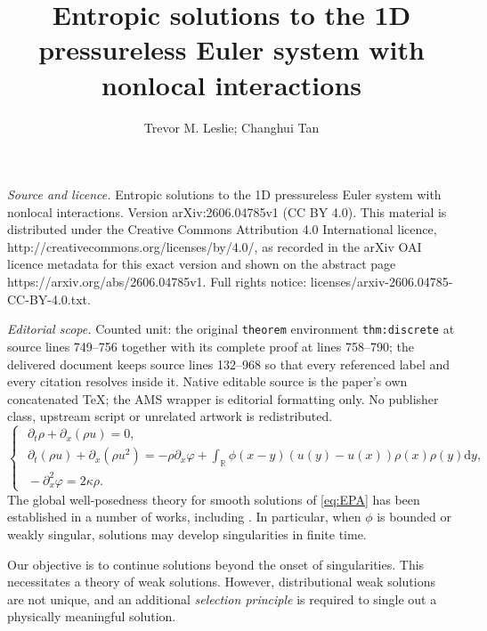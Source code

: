 \documentclass[10pt,a4paper]{amsart}
\def\R{\mathbb{R}}
\def\dd{\mathrm{d}}
\def\pa{\partial}
\begin{document}
\title[Entropic solutions to the 1D pressureless Euler system with ]{Entropic solutions to the 1D pressureless Euler system with nonlocal interactions}
\author{Trevor M. Leslie; Changhui Tan}
\date{}
\maketitle
\noindent\emph{Source and licence.} Entropic solutions to the 1D pressureless Euler system with nonlocal interactions. Version arXiv:2606.04785v1 (CC BY 4.0). This material is distributed under the Creative Commons Attribution 4.0 International licence, http://creativecommons.org/licenses/by/4.0/, as recorded in the arXiv OAI licence metadata for this exact version and shown on the abstract page https://arxiv.org/abs/2606.04785v1. Full rights notice: licenses/arxiv-2606.04785-CC-BY-4.0.txt.\par\smallskip
\noindent\textit{Editorial scope.} Counted unit: the original \texttt{theorem} environment \texttt{thm:discrete} at source lines 749--756 together with its complete proof at lines 758--790; the delivered document keeps source lines 132--968 so that every referenced label and every citation resolves inside it. Native editable source is the paper's own concatenated TeX; the AMS wrapper is editorial formatting only. No publisher class, upstream script or unrelated artwork is redistributed.
	\begin{equation}\label{eq:EPA}
		\begin{cases}
			\,\,\pa_t \rho +\pa_x(\rho u)=0,\\
			\,\,\pa_t (\rho u) +\pa_x (\rho u^2) = -\rho\pa_x\varphi + \displaystyle \int_\R \phi(x-y)(u(y)-u(x))\rho(x)\rho(y)\dd y,\\
			\,\, -\pa_x^2\varphi = 2\kappa\rho.
		\end{cases}
	\end{equation}
	The global well-posedness theory for smooth solutions of \eqref{eq:EPA} has been established in a number of works, including \cite{carrillo2016critical,kiselev2018global,bhatnagar2020critical2,bhatnagar2023critical,choi2025critical,luan2025euler}. In particular, when $\phi$ is bounded or weakly singular, solutions may develop singularities in finite time.
	
	Our objective is to continue solutions beyond the onset of singularities. This necessitates a theory of weak solutions. However, distributional weak solutions are not unique, and an additional \emph{selection principle} is required to single out a physically meaningful solution.
	
\end{document}
